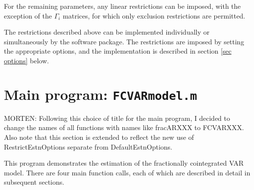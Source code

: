 \documentclass[12pt]{article}
\begin{document}
For the remaining parameters, any linear restrictions can be imposed, with the exception of the $\Gamma_i$ matrices, for which only exclusion restrictions are permitted.


The restrictions described above can be implemented individually or simultaneously by the software package. The restrictions are imposed by setting the appropriate options, and the implementation is described in section \ref{sec options} below. 


\newpage

\section{Main program: \texttt{FCVARmodel.m}\label{sec main}}

MORTEN: Following this choice of title for the main program, I decided to change the names of all functions with names like fracARXXX to FCVARXXX.
Also note that this section is extended to reflect the new use of RestrictEstnOptions separate from DefaultEstnOptions.

This program demonstrates the estimation of the fractionally cointegrated VAR model. There are four main function calls, each of which are described in detail in subsequent sections.
\end{document}
